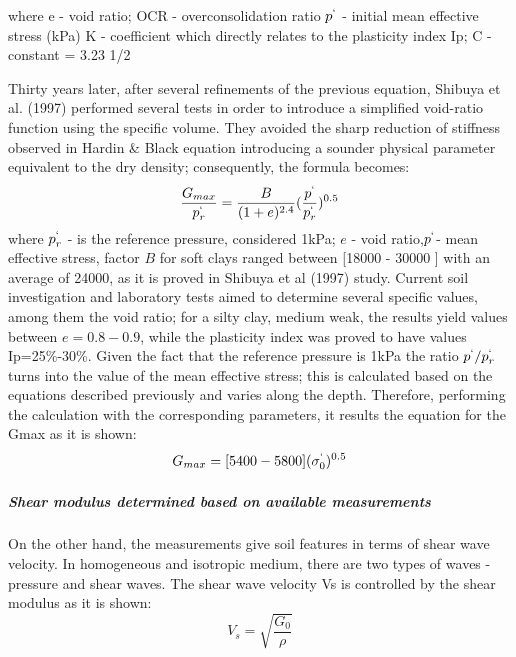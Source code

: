 \documentclass[10pt,a4paper]{report}
\begin{document}
where e - void ratio;
OCR - overconsolidation ratio
$p^`$ - initial mean effective stress (kPa)
K - coefficient which directly relates to the plasticity index Ip;
C - constant = 3.23 1/2 

Thirty years later, after several refinements of the previous equation, Shibuya et al. (1997) performed several tests in order to introduce a simplified void-ratio function using the specific volume. They avoided the sharp reduction of stiffness observed in Hardin \& Black equation introducing a sounder physical parameter equivalent to the dry density; consequently, the formula becomes:
\begin{equation}
\frac{G_{max}}{p^`_r}=\frac{B}{(1+e)^{2.4}}(\frac{p^`}{p^`_r})^{0.5}
\end{equation}
where $p^`_r$ - is the reference pressure, considered 1kPa; $e$ - void ratio,$p^`$- mean effective stress, factor $B$ for soft clays ranged between [18000 - 30000 ] with an average of 24000, as it is proved in Shibuya et al (1997) study.
Current soil investigation and laboratory tests aimed to determine several specific values, among them the void ratio; for a silty clay, medium weak, the results yield values between $e=0.8-0.9$, while the plasticity index was proved to have values Ip=25\%-30\%. Given the fact that the reference pressure is 1kPa the ratio $p^`/p^`_r$ turns into the value of the mean effective stress; this is calculated based on the equations described previously and varies along the depth. Therefore, performing the calculation with the corresponding parameters, it results the equation for the Gmax as it is shown:
\begin{equation}
	G_{max}=[5400-5800](\sigma^`_0)^{0.5}
\end{equation}

\subparagraph{Shear modulus determined based on available measurements }
On the other hand, the measurements give soil features in terms of shear wave velocity. In homogeneous and isotropic medium, there are two types of waves - pressure and shear waves. The shear wave velocity Vs is controlled by the shear modulus as it is shown:
\begin{equation}
	V_s=\sqrt{\frac{G_0}{\rho}}
\end{equation}
\end{document}

